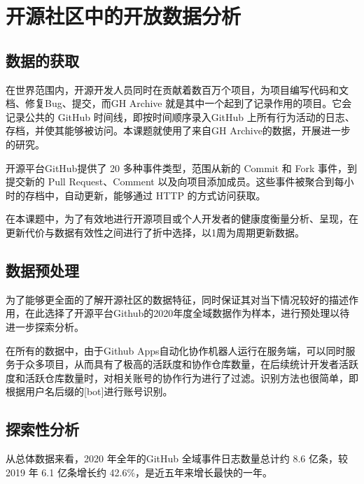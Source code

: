 \section{开源社区中的开放数据分析}

\subsection{数据的获取}
\par 在世界范围内，开源开发人员同时在贡献着数百万个项目，为项目编写代码和文档、修复Bug、提交，而GH Archive 就是其中一个起到了记录作用的项目。它会记录公共的 GitHub 时间线，即按时间顺序录入GitHub 上所有行为活动的日志、存档，并使其能够被访问。本课题就使用了来自GH Archive的数据，开展进一步的研究。

\par 开源平台GitHub提供了 20 多种事件类型，范围从新的 Commit 和 Fork 事件，到提交新的 Pull Request、Comment 以及向项目添加成员。这些事件被聚合到每小时的存档中，自动更新，能够通过 HTTP 的方式访问获取。

\par 在本课题中，为了有效地进行开源项目或个人开发者的健康度衡量分析、呈现，在更新代价与数据有效性之间进行了折中选择，以1周为周期更新数据。

\subsection{数据预处理}
\par 为了能够更全面的了解开源社区的数据特征，同时保证其对当下情况较好的描述作用，在此选择了开源平台Github的2020年度全域数据作为样本，进行预处理以待进一步探索分析。

\par 在所有的数据中，由于Github Apps自动化协作机器人运行在服务端，可以同时服务于众多项目，从而具有了极高的活跃度和协作仓库数量，在后续统计开发者活跃度和活跃仓库数量时，对相关账号的协作行为进行了过滤。识别方法也很简单，即根据用户名后缀的[bot]进行账号识别。



\subsection{探索性分析}
\par 从总体数据来看，2020 年全年的GitHub 全域事件日志数量总计约 8.6 亿条，较 2019 年 6.1 亿条增长约 42.6\%，是近五年来增长最快的一年。

